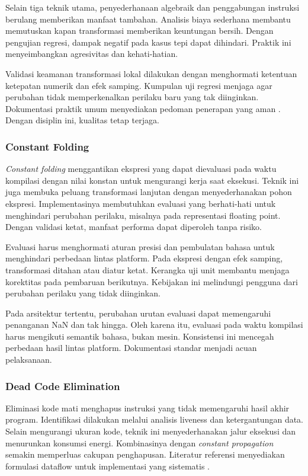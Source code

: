 \documentclass[../main.tex]{subfiles}
\begin{document}
Selain tiga teknik utama, penyederhanaan algebraik dan penggabungan instruksi berulang memberikan manfaat tambahan. Analisis biaya sederhana membantu memutuskan kapan transformasi memberikan keuntungan bersih. Dengan pengujian regresi, dampak negatif pada kasus tepi dapat dihindari. Praktik ini menyeimbangkan agresivitas dan kehati-hatian.

Validasi keamanan transformasi lokal dilakukan dengan menghormati ketentuan ketepatan numerik dan efek samping. Kumpulan uji regresi menjaga agar perubahan tidak memperkenalkan perilaku baru yang tak diinginkan. Dokumentasi praktik umum menyediakan pedoman penerapan yang aman \citep{WikiOptimization}. Dengan disiplin ini, kualitas tetap terjaga.

\subsubsection{Constant Folding}
\emph{Constant folding} menggantikan ekspresi yang dapat dievaluasi pada waktu kompilasi dengan nilai konstan untuk mengurangi kerja saat eksekusi. Teknik ini juga membuka peluang transformasi lanjutan dengan menyederhanakan pohon ekspresi. Implementasinya membutuhkan evaluasi yang berhati-hati untuk menghindari perubahan perilaku, misalnya pada representasi floating point. Dengan validasi ketat, manfaat performa dapat diperoleh tanpa risiko.

Evaluasi harus menghormati aturan presisi dan pembulatan bahasa untuk menghindari perbedaan lintas platform. Pada ekspresi dengan efek samping, transformasi ditahan atau diatur ketat. Kerangka uji unit membantu menjaga korektitas pada pembaruan berikutnya. Kebijakan ini melindungi pengguna dari perubahan perilaku yang tidak diinginkan.

Pada arsitektur tertentu, perubahan urutan evaluasi dapat memengaruhi penanganan NaN dan tak hingga. Oleh karena itu, evaluasi pada waktu kompilasi harus mengikuti semantik bahasa, bukan mesin. Konsistensi ini mencegah perbedaan hasil lintas platform. Dokumentasi standar menjadi acuan pelaksanaan.

\subsubsection{Dead Code Elimination}
Eliminasi kode mati menghapus instruksi yang tidak memengaruhi hasil akhir program. Identifikasi dilakukan melalui analisis liveness dan ketergantungan data. Selain mengurangi ukuran kode, teknik ini menyederhanakan jalur eksekusi dan menurunkan konsumsi energi. Kombinasinya dengan \emph{constant propagation} semakin memperluas cakupan penghapusan. Literatur referensi menyediakan formulasi dataflow untuk implementasi yang sistematis \citep{WikiDCE}.
\end{document}
